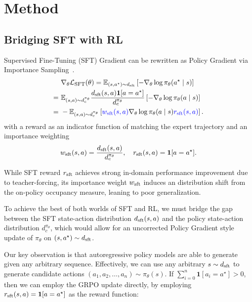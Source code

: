 \section{Method}
\label{sec:method}

\subsection{Bridging SFT with RL}
Supervised Fine-Tuning (SFT) Gradient can be rewritten as Policy Gradient via Importance Sampling~\citep{wu2025generalization}.
\begin{align*}
&~ \nabla_\theta \mathcal{L}_{\text{SFT}}(\theta) = \mathbb{E}_{(s, a^\star) \sim d_{\mathrm{sft}}} \left[ -\nabla_\theta \log \pi_\theta(a^\star \mid s) \right] \\
= &~ \mathbb{E}_{(s,a) \sim d^{\pi_\theta}_c} \frac{d_{\mathrm{sft}}(s,a)\mathbf{1}[a =a^\star]}{d^{\pi_\theta}_c} \left[ -\nabla_\theta \log \pi_\theta(a \mid s) \right] \\
= &~ -\mathbb{E}_{(s,a) \sim d^{\pi_\theta}_c} \left[ {\color{blue}w_{\mathrm{sft}}(s,a)} \nabla_\theta \log \pi_\theta(a \mid s) {\color{blue}r_{\mathrm{sft}}(s, a)} \right].
\end{align*}
with a reward as an indicator function of matching the expert trajectory and an importance weighting
\begin{align*}
w_{\mathrm{sft}}(s,a) = \frac{d_{\mathrm{sft}}(s,a)}{d^{\pi_\theta}_c}, \quad r_{\mathrm{sft}}(s, a) = \mathbf{1}[a =a^\star].
\end{align*}

While SFT reward $r_{\mathrm{sft}}$ achieves strong in-domain performance improvement due to teacher-forcing, its importance weight $w_{\mathrm{sft}}$ induces an distribution shift from the on-policy occupancy measure, leaning to poor generalization. 

To achieve the best of both worlds of SFT and RL, we must bridge the gap between the SFT state-action distribution $d_{\mathrm{sft}}(s,a)$ and the policy state-action distribution $d^{\pi_\theta}_c$, which would allow for an uncorrected Policy Gradient style update of $\pi_\theta$ on $(s, a^\star) \sim d_{\mathrm{sft}}$.

Our key observation is that autoregressive policy models are able to generate given any arbitrary sequence. Effectively, we can use any arbitrary $s \sim d_{\mathrm{sft}}$ to generate candidate actions $(a_1, a_2, \dots, a_n) \sim \pi_{\theta}(s)$. If $\sum_{i=0}^{n}\mathbf{1}[a_i = a^\star] > 0$, then we can employ the GRPO \citep{shenfeld2025rlsrazoronlinereinforcement} update directly, by employing $r_{\mathrm{sft}}(s, a) = \mathbf{1}[a = a^\star]$ as the reward function:

